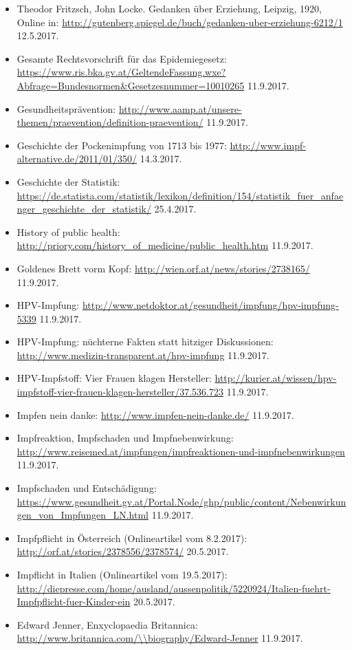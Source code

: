 \documentclass[
    a4paper,
    12pt,
    hyphens,
    chapterprefix=true,
    headheight=33pt,
    footheight=29pt,
    headings=optiontohead, %
]{scrartcl}
\begin{document}
{\begin{itemize}
\item{Theodor Fritzsch, John Locke. Gedanken über Erziehung, Leipzig, 1920, Online in: \url{http://gutenberg.spiegel.de/buch/gedanken-uber-erziehung-6212/1} 12.5.2017.}
\item{Gesamte Rechtsvorschrift für das Epidemiegesetz: \url{https://www.ris.bka.gv.at/GeltendeFassung.wxe?Abfrage=Bundesnormen&Gesetzesnummer=10010265} 11.9.2017.}
\item{Gesundheitsprävention: \url{http://www.aamp.at/unsere-themen/praevention/definition-praevention/} 11.9.2017.}
\item{Geschichte der Pockenimpfung von 1713 bis 1977: \url{http://www.impf-alternative.de/2011/01/350/} 14.3.2017.}
\item{Geschichte der Statistik: \url{https://de.statista.com/statistik/lexikon/definition/154/statistik_fuer_anfaenger_geschichte_der_statistik/} 25.4.2017.}
\item{History of public health: \url{http://priory.com/history_of_medicine/public_health.htm} 11.9.2017.}
\item{Goldenes Brett vorm Kopf: \url{http://wien.orf.at/news/stories/2738165/} 11.9.2017.}
\item{HPV-Impfung: \url{http://www.netdoktor.at/gesundheit/impfung/hpv-impfung-5339} 11.9.2017.}
\item{HPV-Impfung: nüchterne Fakten statt hitziger Diskussionen: \url{http://www.medizin-transparent.at/hpv-impfung} 11.9.2017.}
\item{HPV-Impfstoff: Vier Frauen klagen Hersteller: \url{http://kurier.at/wissen/hpv-impfstoff-vier-frauen-klagen-hersteller/37.536.723} 11.9.2017.}
\item{Impfen nein danke: \url{http://www.impfen-nein-danke.de/} 11.9.2017.}
\item{Impfreaktion, Impfschaden und Impfnebenwirkung: \url{http://www.reisemed.at/impfungen/impfreaktionen-und-impfnebenwirkungen} 11.9.2017.}
\item{Impfschaden und Entschädigung: \url{https://www.gesundheit.gv.at/Portal.Node/ghp/public/content/Nebenwirkungen_von_Impfungen_LN.html} 11.9.2017.}
\item{Impfpflicht in Österreich (Onlineartikel vom 8.2.2017): \url{http://orf.at/stories/2378556/2378574/} 20.5.2017.}
\item{Impflicht in Italien (Onlineartikel vom 19.5.2017): \url{http://diepresse.com/home/ausland/aussenpolitik/5220924/Italien-fuehrt-Impfpflicht-fuer-Kinder-ein} 20.5.2017.}
\item{Edward Jenner, Enxyclopaedia Britannica: \url{http://www.britannica.com/\\biography/Edward-Jenner} 11.9.2017.}

\end{itemize}}
\end{document}
